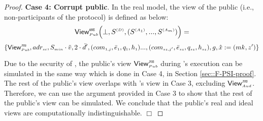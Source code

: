 \begin{proof}
 
 

\noindent\textbf{Case 4: Corrupt public}. In the real model, the view of the public (i.e., non-participants of the protocol) is defined as below: 
 $$ \mathsf{View}_{\scriptscriptstyle Pub}^{\scriptscriptstyle \mathtt{ANE}} \Big(\bot, S^{\scriptscriptstyle (D)},(S^{\scriptscriptstyle (A_1)},..., S^{\scriptscriptstyle (A_m)})\Big)=$$ $$ 
\{\mathsf{View}^{\scriptscriptstyle \mathtt{JUS}}_{\scriptscriptstyle Pub}, adr_{\scriptscriptstyle sc}, S_{\scriptscriptstyle min}\cdot \ddot{v}, 2\cdot \ddot{d}', (com_{\scriptscriptstyle 1,j}, \bar{e}_{\scriptscriptstyle 1}, q_{\scriptscriptstyle 1}, h_{\scriptscriptstyle 1})..., (com_{\scriptscriptstyle sz, j'}, \bar{e}_{\scriptscriptstyle sz}, q_{\scriptscriptstyle {sz}}, h_{\scriptscriptstyle sz}), g, \hat{x}:=({mk}, z')\}$$
 
 
 
  Due to the security of \fpsi, the public's view $\mathsf{View}^{\scriptscriptstyle \mathtt{JUS}}_{\scriptscriptstyle Pub}$ during \fpsi's execution can be simulated in the same way which is done in Case 4, in Section \ref{sec::F-PSI-proof}. The rest of the public's view overlaps with \aud's view in Case 3, excluding $\mathsf{View}^{\scriptscriptstyle \mathtt{JUS}}_{\scriptscriptstyle Aud}$. Therefore, we can use the argument provided in Case 3 to show that the rest of the public's view can be simulated.     
   We  conclude that the public's real and ideal views are computationally indistinguishable. 
  \hfill\(\Box\)\end{proof}















